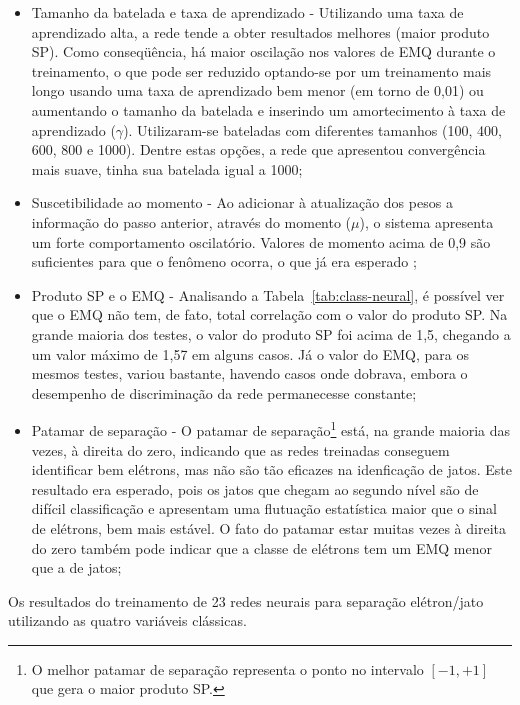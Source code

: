 \begin{itemize}
\item Tamanho da batelada e taxa de aprendizado - Utilizando uma taxa de
aprendizado alta, a rede tende a obter resultados melhores (maior produto
SP). Como conseqüência, há maior oscilação nos valores de EMQ durante o
treinamento, o que pode ser reduzido optando-se por um treinamento mais longo
usando uma taxa de aprendizado bem menor (em torno de 0,01) ou aumentando o
tamanho da batelada e inserindo um amortecimento à taxa de aprendizado
($\gamma$). Utilizaram-se bateladas com diferentes tamanhos (100, 400, 600,
800 e 1000). Dentre estas opções, a rede que apresentou convergência mais
suave, tinha sua batelada igual a 1000;

\item Suscetibilidade ao momento - Ao adicionar à atualização dos pesos a
informação do passo anterior, através do momento ($\mu$), o sistema apresenta
um forte comportamento oscilatório. Valores de momento acima de 0,9 são
suficientes para que o fenômeno ocorra, o que já era esperado \cite{hertz};

\item Produto SP e o EMQ - Analisando a Tabela~\ref{tab:class-neural}, é
possível ver que o EMQ não tem, de fato, total correlação com o valor do
produto SP. Na grande maioria dos testes, o valor do produto SP foi acima de
1,5, chegando a um valor máximo de 1,57 em alguns casos. Já o valor do EMQ,
para os mesmos testes, variou bastante, havendo casos onde dobrava, embora o
desempenho de discriminação da rede permanecesse constante;

\item Patamar de separação - O patamar de separação\footnote{O melhor patamar
de separação representa o ponto no intervalo $[-1,+1]$ que gera o maior
produto SP.} está, na grande maioria das vezes, à direita do zero, indicando
que as redes treinadas conseguem identificar bem elétrons, mas não são tão
eficazes na idenficação de jatos. Este resultado era esperado, pois os jatos
que chegam ao segundo nível são de difícil classificação e apresentam uma
flutuação estatística maior que o sinal de elétrons, bem mais estável. O fato
do patamar estar muitas vezes à direita do zero também pode indicar que a
classe de elétrons tem um EMQ menor que a de jatos;

\end{itemize}

\renewcommand{\baselinestretch}{1}
\begin{table}
\caption{Os resultados do treinamento de 23 redes neurais para
separação elétron/jato utilizando as quatro variáveis clássicas.}
\label{tab:class-neural}
\renewcommand{\baselinestretch}{1.25}
\small
\begin{center}
\begin{sideways}

\end{sideways}
\end{center}
\end{table}
\renewcommand{\baselinestretch}{1.5}
\normalsize

